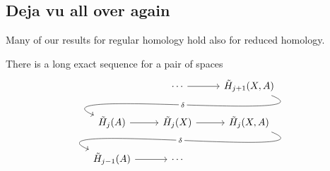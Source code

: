 \documentclass[main.tex]{subfiles}
\begin{document}
\subsection{Deja vu all over again}
\label{ssc:deja_vu_all_over_again}

Many of our results for regular homology hold also for reduced homology.

\begin{proposition}
  There is a long exact sequence for a pair of spaces
  \begin{equation*}
    \begin{tikzcd}
      & \cdots
      \arrow[r]
      & \tilde{H}_{j+1}(X, A)
      \\
      \tilde{H}_{j}(A)
      \arrow[from=urr, out=-22, in=157, looseness=1, overlay, "\delta" description]
      \arrow[r,]
      & \tilde{H}_{j}(X)
      \arrow[r,]
      & \tilde{H}_{j}(X, A)
      \\
      \tilde{H}_{j-1}(A)
      \arrow[r]
      \arrow[from=urr, out=-22, in=157, looseness=1, overlay, "\delta" description]
      & \cdots
    \end{tikzcd}
  \end{equation*}
\end{proposition}
\end{document}
